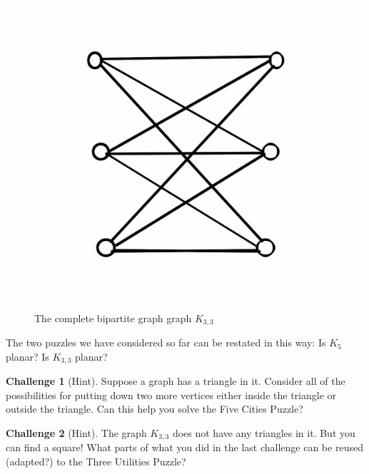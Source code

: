 \documentclass[12pt,letterpaper]{article}
\theoremstyle{definition}
\newtheorem*{challenge}{Challenge}
\begin{document}
\begin{figure}[h]
\centering
\includegraphics[width=.6\textwidth]{images/k3,3.png}
\caption{The complete bipartite graph graph $K_{3,3}$}
\label{figure:stdk33}
\end{figure}

The two puzzles we have considered so far can be restated in this way: Is $K_5$ planar? Is $K_{3,3}$ planar?

\begin{challenge}[Hint] Suppose a graph has a triangle in it. Consider all of the possibilities for putting down 
two more vertices either inside the triangle or outside the triangle. Can this help you solve the Five Cities
Puzzle?
\end{challenge}

\begin{challenge}[Hint] The graph $K_{3,3}$ does not have any triangles in it. But you can find a square!
What parts of what you did in the last challenge can be reused (adapted?) to the Three Utilities Puzzle?
\end{challenge}



\end{document}
